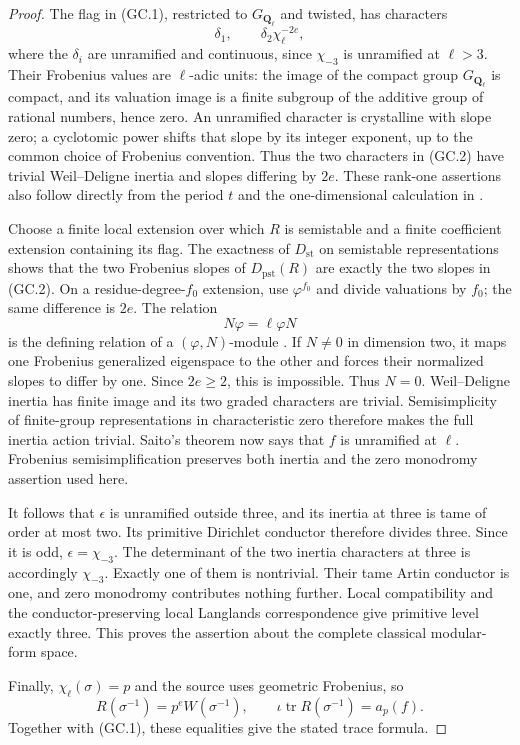 \begin{proof}
The flag in (GC.1), restricted to $G_{\mathbf Q_\ell}$ and twisted,
has characters
\[
       \delta_1,\qquad \delta_2\chi_\ell^{-2e},
 \tag{GC.2}
\]
where the $\delta_i$ are unramified and continuous, since
$\chi_{-3}$ is unramified at $\ell>3$.
Their Frobenius values are $\ell$-adic units: the image of the compact
group $G_{\mathbf Q_\ell}$ is compact, and its valuation image is a
finite subgroup of the additive group of rational numbers, hence zero.
An unramified character is crystalline with slope zero; a cyclotomic
power shifts that slope by its integer exponent, up to the common
choice of Frobenius convention. Thus the two characters in (GC.2)
have trivial Weil--Deligne inertia and slopes differing by $2e$.
These rank-one assertions also follow directly from the period $t$
and the one-dimensional calculation in
\cite[\S4.2, Proposition~4.4 and its proof, p.~24]{K17ColmezFontaine2000}.

Choose a finite local extension over which $R$ is semistable and a
finite coefficient extension containing its flag. The exactness of
$D_{\mathrm{st}}$ on semistable representations
\cite[\S4.1, Proposition~4.2, p.~23]{K17ColmezFontaine2000}
shows that the two Frobenius slopes of $D_{\mathrm{pst}}(R)$ are exactly
the two slopes in (GC.2). On a residue-degree-$f_0$ extension, use
$\varphi^{f_0}$ and divide valuations by $f_0$; the same difference is
$2e$. The relation
\[
                  N\varphi=\ell\varphi N
\]
is the defining relation of a $(\varphi,N)$-module
\cite[\S3.3, p.~21]{K17ColmezFontaine2000}.
If $N\ne0$ in dimension two, it maps one Frobenius generalized
eigenspace to the other and forces their normalized slopes to differ
by one. Since $2e\ge2$, this is impossible. Thus $N=0$.
Weil--Deligne inertia has finite image and its two graded characters
are trivial. Semisimplicity of finite-group representations in
characteristic zero therefore makes the full inertia action trivial.
Saito's theorem now says that $f$ is unramified at $\ell$.
Frobenius semisimplification preserves both inertia and the zero
monodromy assertion used here.

It follows that $\epsilon$ is unramified outside three, and its inertia
at three is tame of order at most two. Its primitive Dirichlet conductor
therefore divides three. Since it is odd, $\epsilon=\chi_{-3}$.
The determinant of the two inertia characters at three is accordingly
$\chi_{-3}$. Exactly one of them is nontrivial. Their tame Artin
conductor is one, and zero monodromy contributes nothing further.
Local compatibility and the conductor-preserving local Langlands
correspondence give primitive level exactly three. This proves the
assertion about the complete classical modular-form space.

Finally, $\chi_\ell(\sigma)=p$ and the source uses geometric Frobenius,
so
\[
 R(\sigma^{-1})=p^eW(\sigma^{-1}),\qquad
 \iota\operatorname{tr}R(\sigma^{-1})=a_p(f).
\]
Together with (GC.1), these equalities give the stated trace formula.
\end{proof}

